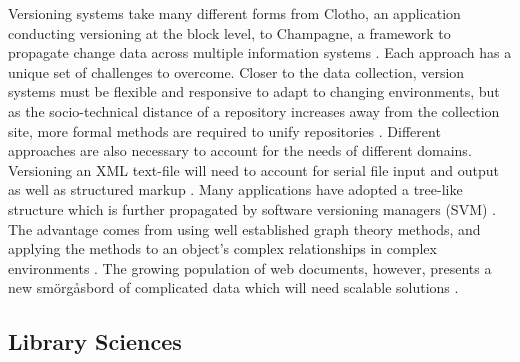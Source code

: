 Versioning systems take many different forms from Clotho, an application conducting versioning at the block level, to Champagne, a framework to propagate change data across multiple information systems \cite{Flouris04clotho:transparent} \cite{Systems02champagne:data}.
Each approach has a unique set of challenges to overcome.
Closer to the data collection, version systems must be flexible and responsive to adapt to changing environments, but as the socio-technical distance of a repository increases away from the collection site, more formal methods are required to unify repositories \cite{Baker2009}.
Different approaches are also necessary to account for the needs of different domains.
Versioning an XML text-file will need to account for serial file input and output as well as structured markup \cite{Chien:2000:VMX:646544.696357}.
Many applications have adopted a tree-like structure which is further propagated by software versioning managers (SVM) \cite{Stuckenholz:2005:CEV:1039174.1039197}.
The advantage comes from using well established graph theory methods, and applying the methods to an object's complex relationships in complex environments \cite{Dijkstra1994}.
The growing population of web documents, however, presents a new smörgåsbord of complicated data which will need scalable solutions \cite{Berberich:2007:TMT:1277741.1277831}.

\subsection{Library Sciences}

